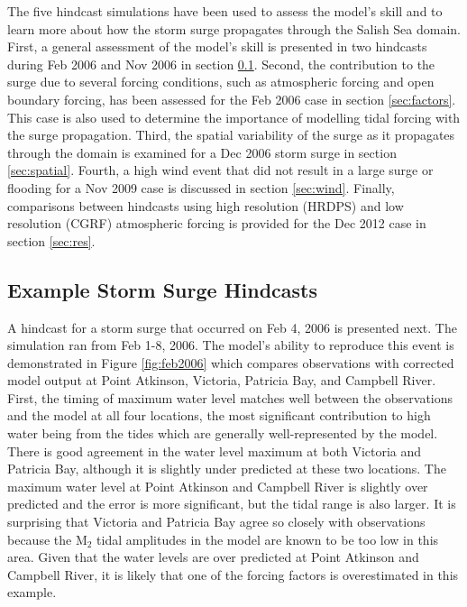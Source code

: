\documentclass[letterpaper]{tATO2e}
\begin{document}
The five hindcast simulations have been used to assess the model's skill and to learn more about how the storm surge propagates through the Salish Sea domain.  First, a general assessment of the model's skill is presented in two hindcasts during Feb 2006 and Nov 2006 in section \ref{sec:hind}.  Second, the contribution to the surge due to several forcing conditions, such as atmospheric forcing and open boundary forcing, has been assessed for the Feb 2006 case in section \ref{sec:factors}. This case is also used to determine the importance of modelling tidal forcing with the surge propagation. Third, the spatial variability of the surge as it propagates through the domain is examined for a Dec 2006 storm surge in section \ref{sec:spatial}. Fourth, a high wind event that did not result in a large surge or flooding for a Nov 2009 case is discussed in section \ref{sec:wind}. Finally, comparisons between hindcasts using high resolution (HRDPS) and low resolution (CGRF) atmospheric forcing is provided for the Dec 2012 case in section \ref{sec:res}. 

\subsection{Example Storm Surge Hindcasts}\label{sec:hind}

A hindcast for a storm surge that occurred on Feb 4, 2006 is presented next. The simulation ran from Feb 1-8, 2006. The model's ability to reproduce this event is demonstrated in Figure \ref{fig:feb2006} which compares observations {\color{red} with} corrected model output at Point Atkinson, Victoria, Patricia Bay, and Campbell River. First, the timing of maximum water level matches well between the observations and the model at all four locations, the most significant contribution to high water being from the tides which are generally well-represented by the model. There is good agreement in the water level maximum at both Victoria and Patricia Bay, although it is slightly under predicted at these two locations. The maximum water level at Point Atkinson and Campbell River is slightly over predicted and the error is more significant, but the tidal range is also larger. It is surprising that Victoria and Patricia Bay agree so closely with observations because the M$_2$ tidal amplitudes in the model are known to be too low in this area. {\color{red} Given that the water levels are over predicted at Point Atkinson and Campbell River, it is likely that one of the forcing factors is overestimated in this example. }
\end{document}
